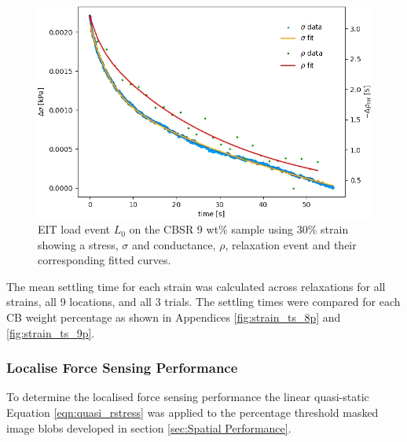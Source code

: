 \begin{figure}[H]
    \centering
    \includegraphics[width=0.8\linewidth]{Figures/2D Push event 0 - CBSR 9 wt 30p strain - 2D compressionv2.jpg}
    \caption{EIT load event $L_0$ on the CBSR 9 wt\% sample using 30\% strain showing a stress, $\sigma$ and conductance, $\rho$, relaxation event and their corresponding fitted curves.}
    \label{fig:blob_global_relaxation}
\end{figure}

The mean settling time for each strain was calculated across relaxations for all strains, all 9 locations, and all 3 trials. The settling times were compared for each CB weight percentage as shown in Appendices \ref{fig:strain_ts_8p} and \ref{fig:strain_ts_9p}.

\subsubsection{Localise Force Sensing Performance}\label{sec:Localised Force Sensing Performance2}
To determine the localised force sensing performance the linear quasi-static Equation \ref{eqn:quasi_rstress} was applied to the percentage threshold masked image blobs developed in section \ref{sec:Spatial Performance}.

